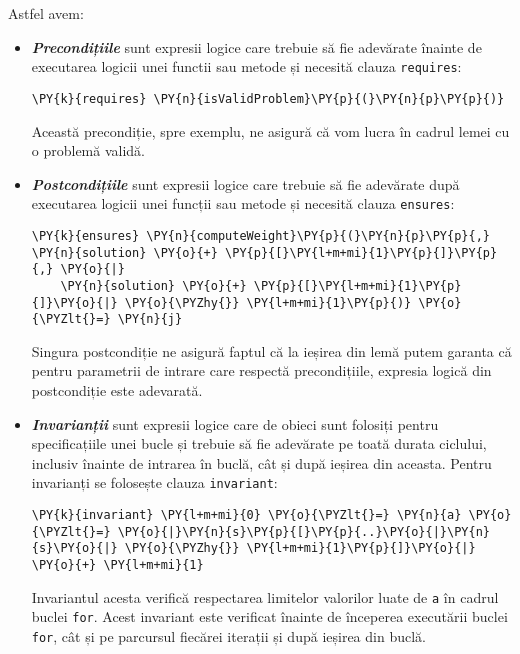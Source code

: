 Astfel avem:
\begin{itemize}
    \item \textit{\textbf{\textcolor{coleight}{Precondițiile}}} sunt expresii logice care trebuie să fie adevărate înainte de executarea logicii unei functii sau metode și necesită clauza \texttt{requires}:
    \begin{Verbatim}[commandchars=\\\{\}]
  \PY{k}{requires} \PY{n}{isValidProblem}\PY{p}{(}\PY{n}{p}\PY{p}{)}
\end{Verbatim}
Această precondiție, spre exemplu, ne asigură că vom lucra în cadrul lemei cu o problemă validă.
\item \textit{\textbf{\textcolor{coleight}{Postcondițiile}}} sunt expresii logice care trebuie să fie adevărate după executarea logicii unei funcții sau metode și necesită clauza \texttt{ensures}:
    \begin{Verbatim}[commandchars=\\\{\}]
  \PY{k}{ensures} \PY{n}{computeWeight}\PY{p}{(}\PY{n}{p}\PY{p}{,} \PY{n}{solution} \PY{o}{+} \PY{p}{[}\PY{l+m+mi}{1}\PY{p}{]}\PY{p}{,} \PY{o}{|}
    \PY{n}{solution} \PY{o}{+} \PY{p}{[}\PY{l+m+mi}{1}\PY{p}{]}\PY{o}{|} \PY{o}{\PYZhy{}} \PY{l+m+mi}{1}\PY{p}{)} \PY{o}{\PYZlt{}=} \PY{n}{j}
\end{Verbatim}
    Singura postcondiție ne asigură faptul că la ieșirea din lemă putem garanta că pentru parametrii de intrare care respectă precondițiile, expresia logică din postcondiție este adevarată.
    \item \textit{\textbf{\textcolor{coleight}{Invarianții}}} sunt expresii logice care de obieci sunt folosiți pentru specificațiile unei bucle și trebuie să fie adevărate pe toată durata ciclului, inclusiv înainte de intrarea în buclă, cât și după ieșirea din aceasta. Pentru invarianți se folosește clauza \texttt{invariant}:
    \begin{Verbatim}[commandchars=\\\{\}]
\PY{k}{invariant} \PY{l+m+mi}{0} \PY{o}{\PYZlt{}=} \PY{n}{a} \PY{o}{\PYZlt{}=} \PY{o}{|}\PY{n}{s}\PY{p}{[}\PY{p}{..}\PY{o}{|}\PY{n}{s}\PY{o}{|} \PY{o}{\PYZhy{}} \PY{l+m+mi}{1}\PY{p}{]}\PY{o}{|} \PY{o}{+} \PY{l+m+mi}{1}
\end{Verbatim}
    Invariantul acesta verifică respectarea limitelor valorilor luate de \texttt{a} în cadrul buclei \texttt{for}. Acest invariant este verificat înainte de începerea executării buclei \texttt{for}, cât și pe parcursul fiecărei iterații și după ieșirea din buclă.
\end{itemize}


